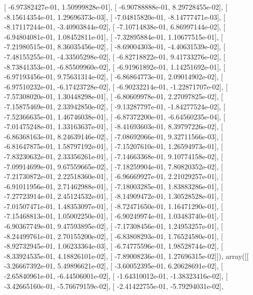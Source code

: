 \documentclass{article}
\begin{document}
       [ -6.97382427e-01,   1.50999828e-01],
       [ -6.90788888e-01,   8.29728455e-02],
       [ -8.15614354e-01,   1.29696373e-03],
       [ -7.04815820e-01,  -8.14777471e-03],
       [ -8.17117244e-01,  -3.40903844e-02],
       [ -7.10714838e-01,   6.86997144e-02],
       [ -6.94804081e-01,   1.08452811e-01],
       [ -7.32895884e-01,   1.10677515e-01],
       [ -7.21980515e-01,   8.36035456e-02],
       [ -8.69004303e-01,  -4.40631539e-02],
       [ -7.48155255e-01,  -4.33505298e-02],
       [ -6.82718822e-01,   9.41733276e-02],
       [ -8.73841353e-01,  -6.85509960e-02],
       [ -6.91961892e-01,   1.14251692e-01],
       [ -6.97193456e-01,   9.75631314e-02],
       [ -6.86864773e-01,   2.09014902e-02],
       [ -6.97510232e-01,  -6.17423728e-02],
       [ -6.90232214e-01,  -1.22871707e-02],
       [ -7.57308020e-01,   1.30448298e-01],
       [ -6.80609978e-01,   2.27097825e-02],
       [ -7.15875469e-01,   2.33942850e-02],
       [ -9.13287797e-01,  -1.84277524e-02],
       [ -7.52366635e-01,   1.46746038e-01],
       [ -6.87372200e-01,  -6.64560235e-04],
       [ -7.01475248e-01,   1.33163637e-01],
       [ -8.41693603e-01,   8.39797226e-02],
       [ -6.86368163e-01,   8.24639146e-02],
       [ -7.08692066e-01,   9.32711566e-03],
       [ -6.81647875e-01,   1.58797192e-01],
       [ -7.15207610e-01,   1.26594973e-01],
       [ -7.83230632e-01,   2.33356261e-01],
       [ -7.14663368e-01,   9.10774158e-02],
       [ -7.09914699e-01,   9.67559665e-02],
       [ -7.18259904e-01,   7.80820352e-02],
       [ -7.21730872e-01,   2.22518360e-01],
       [ -6.96669927e-01,   2.21029257e-01],
       [ -6.91011956e-01,   2.71462988e-01],
       [ -7.18003285e-01,   1.83883286e-01],
       [ -7.27723914e-01,   2.45124532e-01],
       [ -8.14909472e-01,   1.30528528e-01],
       [ -7.01507471e-01,   1.48353097e-01],
       [ -8.72471650e-01,   1.16471290e-01],
       [ -7.15468813e-01,   1.05002250e-01],
       [ -6.90249974e-01,   1.03483740e-01],
       [ -6.90367749e-01,   9.47593895e-02],
       [ -7.17308456e-01,   1.24953257e-01],
       [ -8.24499761e-01,   2.70155200e-02],
       [ -6.83808293e-01,   1.76524580e-01],
       [ -8.92732945e-01,   1.06233364e-03],
       [ -6.74775596e-01,   1.98528744e-02],
       [ -8.33924535e-01,   4.18826101e-02],
       [ -7.89008236e-01,   1.27696315e-02]]), array([[ -3.26667392e-01,   5.49896621e-02],
       [ -3.60052395e-01,   6.20628691e-02],
       [ -2.65840961e-01,  -6.44506001e-02],
       [ -1.64310012e-01,  -1.38323416e-02],
       [ -3.42665160e-01,  -5.76679159e-02],
       [ -2.41422755e-01,  -5.79294031e-02],
\end{document}

